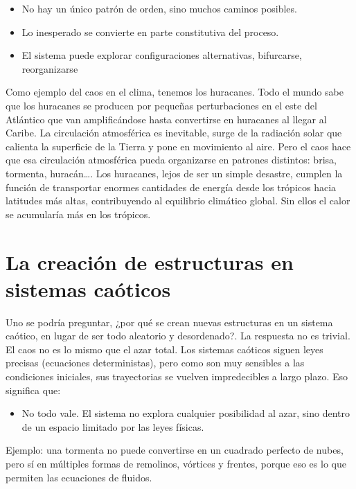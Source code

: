 \documentclass[
  11pt,
  a4paper,
  DIV=11,
  numbers=noendperiod]{scrreprt}
\providecommand{\tightlist}{%
  \setlength{\itemsep}{0pt}\setlength{\parskip}{0pt}}
\begin{document}
\begin{itemize}
\item
  No hay un único patrón de orden, sino muchos caminos posibles.
\item
  Lo inesperado se convierte en parte constitutiva del proceso.
\item
  El sistema puede explorar configuraciones alternativas, bifurcarse,
  reorganizarse
\end{itemize}

Como ejemplo del caos en el clima, tenemos los huracanes. Todo el mundo
sabe que los huracanes se producen por pequeñas perturbaciones en el
este del Atlántico que van amplificándose hasta convertirse en huracanes
al llegar al Caribe. La circulación atmosférica es inevitable, surge de
la radiación solar que calienta la superficie de la Tierra y pone en
movimiento al aire. Pero el caos hace que esa circulación atmosférica
pueda organizarse en patrones distintos: brisa, tormenta, huracán\ldots.
Los huracanes, lejos de ser un simple desastre, cumplen la función de
transportar enormes cantidades de energía desde los trópicos hacia
latitudes más altas, contribuyendo al equilibrio climático global. Sin
ellos el calor se acumularía más en los trópicos.

\section{La creación de estructuras en sistemas
caóticos}\label{la-creaciuxf3n-de-estructuras-en-sistemas-cauxf3ticos}

Uno se podría preguntar, ¿por qué se crean nuevas estructuras en un
sistema caótico, en lugar de ser todo aleatorio y desordenado?. La
respuesta no es trivial. El caos no es lo mismo que el azar total. Los
sistemas caóticos siguen leyes precisas (ecuaciones deterministas), pero
como son muy sensibles a las condiciones iniciales, sus trayectorias se
vuelven impredecibles a largo plazo. Eso significa que:

\begin{itemize}
\tightlist
\item
  No todo vale. El sistema no explora cualquier posibilidad al azar,
  sino dentro de un espacio limitado por las leyes físicas.
\end{itemize}

Ejemplo: una tormenta no puede convertirse en un cuadrado perfecto de
nubes, pero sí en múltiples formas de remolinos, vórtices y frentes,
porque eso es lo que permiten las ecuaciones de fluidos.
\end{document}
